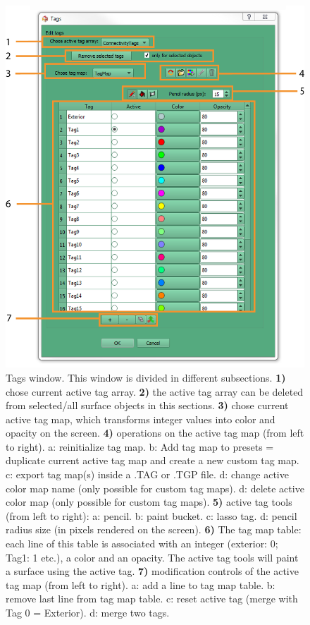 \begin{figure}
  \centering
  \includegraphics[scale=1]{images/12/tags_window2.png}
\caption{Tags window. This window is divided in different subsections. \textbf{1)} chose current active tag array.  \textbf{2)} the active tag array can be deleted from selected/all surface objects in this sections. \textbf{3)} chose current active tag map, which transforms integer values into color and opacity on the screen. \textbf{4)} operations on the active tag map (from left to right). a: reinitialize tag map. b: Add tag map to presets = duplicate current active tag map and create a new custom tag map. c: export tag map(s) inside a .TAG or .TGP file. d: change active color map name (only possible for custom tag maps). d: delete active color map (only possible for custom tag maps). \textbf{5)} active tag tools (from left to right): a: pencil. b: paint bucket. c: lasso tag. d: pencil radius size (in pixels rendered on the screen).  \textbf{6)} The tag map table: each line of this table is associated with an integer (exterior: 0; Tag1: 1 etc.), a color and an opacity. The active tag tools will paint a surface using the active tag. \textbf{7)} modification controls of the active tag map (from left to right). a: add a line to tag map table. b: remove last line from tag map table. c: reset active tag (merge with Tag 0 = Exterior). d: merge two tags.}	
\label{tags_window}
 \end{figure}


